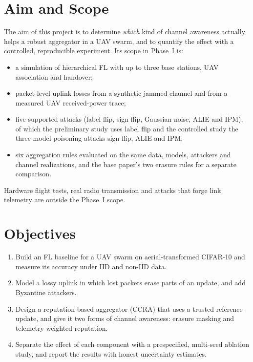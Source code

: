 \section{Aim and Scope}
The aim of this project is to determine \emph{which} kind of channel awareness
actually helps a robust aggregator in a UAV swarm, and to quantify the effect with a
controlled, reproducible experiment. Its scope in Phase~I is:
\begin{itemize}
\item a simulation of hierarchical FL with up to three base stations, UAV
  association and handover;
\item packet-level uplink losses from a synthetic jammed channel and from a measured
  UAV received-power trace;
\item five supported attacks (label flip, sign flip, Gaussian noise, ALIE and IPM),
  of which the preliminary study uses label flip and the controlled study the three
  model-poisoning attacks sign flip, ALIE and IPM;
\item six aggregation rules evaluated on the same data, models, attackers and channel
  realizations, and the base paper's two erasure rules for a separate comparison.
\end{itemize}
Hardware flight tests, real radio transmission and attacks that forge link telemetry
are outside the Phase~I scope.

\section{Objectives}
\begin{enumerate}
\item Build an FL baseline for a UAV swarm on aerial-transformed CIFAR-10 and measure its
  accuracy under IID and non-IID data.
\item Model a lossy uplink in which lost packets erase parts of an update, and add
  Byzantine attackers.
\item Design a reputation-based aggregator (CCRA) that uses a trusted reference
  update, and give it two forms of channel awareness: erasure masking and
  telemetry-weighted reputation.
\item Separate the effect of each component with a prespecified, multi-seed ablation
  study, and report the results with honest uncertainty estimates.
\end{enumerate}

